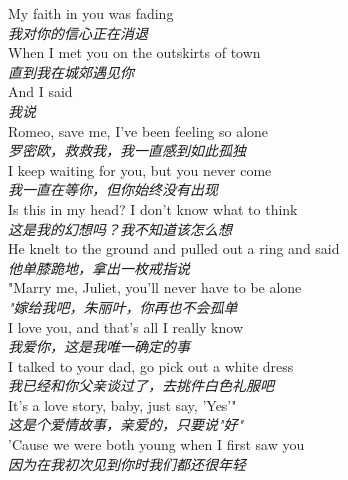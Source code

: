 \begin{spacing}{1.5}
\begin{flushleft}
My faith in you was fading\\
\textit{我对你的信心正在消退}\\[0.5em]

When I met you on the outskirts of town\\
\textit{直到我在城郊遇见你}\\[0.5em]

And I said\\
\textit{我说}\\[0.5em]

Romeo, save me, I've been feeling so alone\\
\textit{罗密欧，救救我，我一直感到如此孤独}\\[0.5em]

I keep waiting for you, but you never come\\
\textit{我一直在等你，但你始终没有出现}\\[0.5em]

Is this in my head? I don't know what to think\\
\textit{这是我的幻想吗？我不知道该怎么想}\\[0.5em]

He knelt to the ground and pulled out a ring and said\\
\textit{他单膝跪地，拿出一枚戒指说}\\[0.5em]

"Marry me, Juliet, you'll never have to be alone\\
\textit{"嫁给我吧，朱丽叶，你再也不会孤单}\\[0.5em]

I love you, and that's all I really know\\
\textit{我爱你，这是我唯一确定的事}\\[0.5em]

I talked to your dad, go pick out a white dress\\
\textit{我已经和你父亲谈过了，去挑件白色礼服吧}\\[0.5em]

It's a love story, baby, just say, 'Yes'"\\
\textit{这是个爱情故事，亲爱的，只要说"好"}\\[0.5em]

'Cause we were both young when I first saw you\\
\textit{因为在我初次见到你时我们都还很年轻}\\[0.5em]
\end{flushleft}
\end{spacing} 
